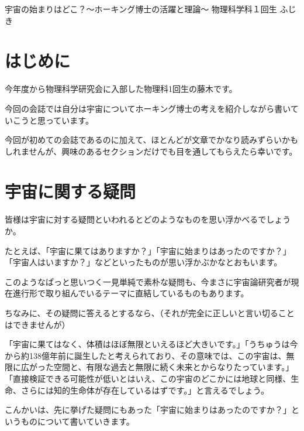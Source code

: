 \documentclass[10pt,b5paper,papersize,dvipdfmx]{jsbook}
\begin{document}


\kaishititle%
  {宇宙の始まりはどこ？～ホーキング博士の活躍と理論～}%
  {物理科学科１回生}%
  {ふじき}%

%
\section*{はじめに}
今年度から物理科学研究会に入部した物理科1回生の藤木です。\par
今回の会誌では自分は宇宙についてホーキング博士の考えを紹介しながら書いていこうと思っています。\par
今回が初めての会誌であるのに加えて、ほとんどが文章でかなり読みずらいかもしれませんが、興味のあるセクションだけでも目を通してもらえたら幸いです。\par




\newpage
%
\section{宇宙に関する疑問}
皆様は宇宙に対する疑問といわれるとどのようなものを思い浮かべるでしょうか。\par
たとえば、「宇宙に果てはありますか？」「宇宙に始まりはあったのですか？」「宇宙人はいますか？」などといったものが思い浮かぶかなとおもいます。\par
このようなぱっと思いつく一見単純で素朴な疑問も、今まさに宇宙論研究者が現在進行形で取り組んでいるテーマに直結しているものもあります。\par
ちなみに、その疑問に答えるとするなら、（それが完全に正しいと言い切ることはできませんが）\par
「宇宙に果てはなく、体積はほぼ無限といえるほど大きいです。」「うちゅうは今から約138億年前に誕生したと考えられており、その意味では、この宇宙は、無限に広がった空間と、有限な過去と無限に続く未来とからなりたっています。」「直接検証できる可能性が低いとはいえ、この宇宙のどこかには地球と同様、生命、さらには知的生命体が存在しているはずです。」と言えるでしょう。\par
こんかいは、先に挙げた疑問にもあった「宇宙に始まりはあったのですか？」というものについて書いていきます。\par



\newpage
\end{document}
